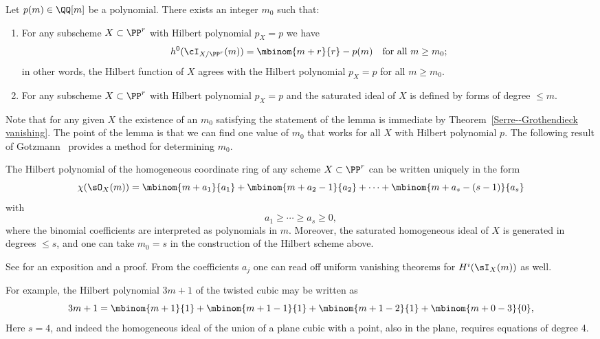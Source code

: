 \begin{npt}
\begin{theorem}
\label{matsusaka}
Let $p(m) \in \QQ[m]$ be a polynomial. There exists an integer $m_0$
%
such that:

\begin{enumerate}
\item For any subscheme $X \subset \PP^r$ with Hilbert polynomial
$p_X = p$ we have
$$
h^0(\cI_{X/\PP^r}(m)) = \mbinom{m+r}{r} - p(m) \quad \text{for all }
m \geq m_0;
$$
in other words, the Hilbert function of $X$ agrees with the Hilbert
polynomial $p_X = p$ for all $m \geq m_0$.

\item For any subscheme $X \subset \PP^r$ with Hilbert polynomial $p_X =
p$ and
the saturated ideal of $X$ is defined by forms of degree $\leq m$.
\end{enumerate}
\end{theorem}
\end{npt}

Note that for any given $X$ the existence of an $m_0$ satisfying the
%
statement of the lemma is immediate by
Theorem~\ref{Serre--Grothendieck vanishing}. The point of the lemma is
that we can find one value of $m_0$ that works for all $X$ with
Hilbert polynomial $p$. The following result of Gotzmann~\citeyear{Gotzmann}
provides a method for determining $m_0$.

\begin{theorem}
The Hilbert polynomial  of the homogeneous coordinate ring of any scheme
$X\subset \PP^r$ can be written uniquely in the form
$$
\chi(\sO_X(m)) = \mbinom{m+a_1}{a_1}+ \mbinom{m+a_2 -1}{a_2}+ \cdots+\mbinom{m+a_s -(s-1)}{a_s}
$$
with
$$
a_1\geq \cdots \geq a_s \geq 0,
$$
where the binomial coefficients are interpreted as polynomials in
$m$. Moreover, the saturated homogeneous ideal of $X$ is
 generated in degrees $\leq s$, and one can take $m_0 = s$ in the
 construction of the Hilbert scheme above.
\unif
\end{theorem}

See \cite{MR1023391} %
for an exposition and a proof. From the coefficients $a_j$ one can read
off uniform vanishing theorems for $H^i(\sI_X(m))$
 as well.

 For example, the Hilbert polynomial $3m+1$ of the twisted cubic may be
 written as
 $$
 3m+1 =  \mbinom{m+1}{1}+ \mbinom{m+1 -1}{1}+\mbinom{m+1 -2}{1}+
\mbinom{m+0 -3}{0},
 $$
 Here $s=4$, and indeed the homogeneous ideal of the union of a plane
 cubic with a point, also in the plane,
 requires equations of degree 4.


